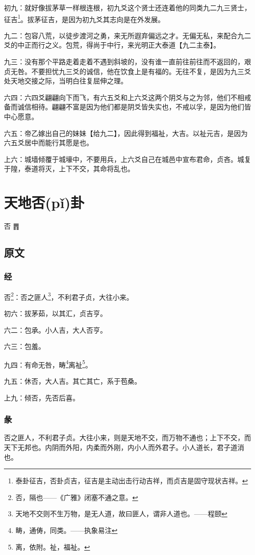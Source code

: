 \documentclass[12pt,oneside]{book}
\begin{document}
初九：就好像拔茅草一样根连根，初九爻这个贤士还连着他的同类九二九三贤士，征吉\footnote{泰卦征吉，否卦贞吉，征吉是主动出击行动吉祥，而贞吉是固守现状吉祥。}。拔茅征吉，是因为初九爻其志向是在外发展。

九二：包容八荒，以徒步渡河之勇，来无所遐弃偏远之才。无偏无私，来配合九二爻的中正而行之义。包荒，得尚于中行，来光明正大泰道【九二主泰】。

九三：没有那个平路走着走着不遇到斜坡的，没有谁一直前往前往而不返回的，艰贞无咎。不要担忧九三爻的诚信，他在饮食上是有福的。无往不复，是因为九三爻处天地交接之际，当明白往复屈伸之理。

六四：六四爻翩翩向下而飞，有六五爻和上六爻这两个阴爻与之为邻，他们不相戒备而诚信相待。翩翩不富是因为他们都是阴爻皆失实也，不戒以孚，是因为他们皆中心愿意。

六五：帝乙嫁出自己的妹妹【给九二】，因此得到福祉，大吉。以祉元吉，是因为六五爻居中而能行其愿是也。

上六：城墙倾覆于城壕中，不要用兵，上六爻自己在城邑中宣布君命，贞吝。城复于隍，泰道将灭，上下不交，其命将乱也。


\chapter{天地否(pǐ)卦}
否 {\Large ䷋}

\section{原文}

\subsection{经}
否\footnote{否，隔也——《广雅》闭塞不通之意。}：否之匪人\footnote{天地不交则不生万物，是无人道，故曰匪人，谓非人道也。——程颐}，不利君子贞，大往小来。

初六：拔茅茹，以其汇，贞吉亨。

六二：包承。小人吉，大人否亨。

六三：包羞。

九四：有命无咎，畴\footnote{畴，通俦，同类。——执象易注}离祉\footnote{离，依附。祉，福祉。}。

九五：休否，大人吉。其亡其亡，系于苞桑。

上九：倾否，先否后喜。

\subsection{彖}
否之匪人，不利君子贞。大往小来，则是天地不交，而万物不通也；上下不交，而天下无邦也。内阴而外阳，内柔而外刚，内小人而外君子。小人道长，君子道消也。
\end{document}
